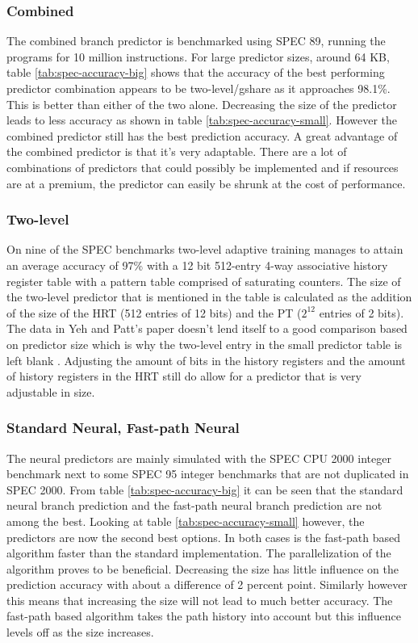 \subsubsection*{Combined}
The combined branch predictor is benchmarked using SPEC 89, running the programs for 10 million instructions.
For large predictor sizes, around 64 KB, table \ref{tab:spec-accuracy-big} shows that the accuracy of the best performing predictor combination appears to be two-level/gshare as it approaches 98.1\%. This is better than either of the two alone. Decreasing the size of the predictor leads to less accuracy as shown in table \ref{tab:spec-accuracy-small}. However the combined predictor still has the best prediction accuracy. A great advantage of the combined predictor is that it's very adaptable. There are a lot of combinations of predictors that could possibly be implemented and if resources are at a premium, the predictor can easily be shrunk at the cost of performance.

\subsubsection*{Two-level}
On nine of the SPEC benchmarks two-level adaptive training manages to attain an average accuracy of 97\% with a 12 bit 512-entry 4-way associative history register table with a pattern table comprised of saturating counters. 
The size of the two-level predictor that is mentioned in the table is calculated as the addition of the size of the HRT (512 entries of 12 bits) and the PT ($2^{12}$ entries of 2 bits). 
The data in Yeh and Patt's paper doesn't lend itself to a good comparison based on predictor size which is why the two-level entry in the small predictor table is left blank \cite{twolevel}. 
Adjusting the amount of bits in the history registers and the amount of history registers in the HRT still do allow for a predictor that is very adjustable in size.


\subsubsection*{Standard Neural, Fast-path Neural}
The neural predictors are mainly simulated with the SPEC CPU 2000 integer benchmark next to some SPEC 95 integer benchmarks that are not duplicated in SPEC 2000. From table \ref{tab:spec-accuracy-big} it can be seen that the standard neural branch prediction and the fast-path neural branch prediction are not among the best. Looking at table \ref{tab:spec-accuracy-small} however, the predictors are now the second best options. In both cases is the fast-path based algorithm faster than the standard implementation. The parallelization of the algorithm proves to be beneficial. Decreasing the size has little influence on the prediction accuracy with about a difference of 2 percent point. Similarly however this means that increasing the size will not lead to much better accuracy. The fast-path based algorithm takes the path history into account but this influence levels off as the size increases.

